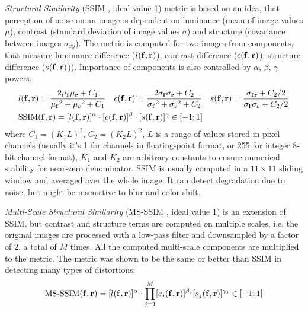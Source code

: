 \textit{Structural Similarity} (SSIM \cite{metric:ssim04}, ideal value 1) metric is based on an idea, that perception of noise on an image is dependent on luminance (mean of image values $\mu$), contrast (standard deviation of image values $\sigma$) and structure (covariance between images $\sigma_{xy}$). The metric is computed for two images from components, that measure luminance difference ($l(\bm{\mathrm{f}}, \bm{\mathrm{r}})$), contrast difference ($c(\bm{\mathrm{f}}, \bm{\mathrm{r}})$), structure difference ($s(\bm{\mathrm{f}}, \bm{\mathrm{r}})$)). Importance of components is also controlled by $\alpha$, $\beta$, $\gamma$ powers.
\begin{equation}
	\setlength\abovedisplayskip{6pt} 
	\begin{aligned}
	& l(\bmr{f}, \bmr{r}) = \frac{2 \mu_{\bmr{f}} \mu_{\bmr{r}} + C_1}{{\mu_{\bmr{f}}}^2 + {\mu_{\bmr{r}}}^2 + C_1} \quad
	c(\bmr{f}, \bmr{r}) = \frac{2 \sigma_{\bmr{f}} \sigma_{\bmr{r}}+ C_2}{{\sigma_{\bmr{f}}}^2 + {\sigma_{\bmr{r}}}^2 + C_2} \quad
	s(\bmr{f}, \bmr{r}) = \frac{\sigma_{\bmr{f}\bmr{r}} + C_2/2}{\sigma_{\bmr{f}}\sigma_{\bmr{r}} + C_2/2} \\
	& \text{SSIM}(\bmr{f}, \bmr{r}) = 
	[l(\bmr{f}, \bmr{r})]^\alpha \cdot
	[c(\bmr{f}, \bmr{r})]^\beta \cdot
	[s(\bmr{f}, \bmr{r})]^\gamma \in [-1;1]
	\end{aligned}
	\setlength\belowdisplayskip{6pt}
\end{equation}
where $C_1 = (K_1L)^2$, $C_2 = (K_2L)^2$,  $L$ is a range of values stored in pixel channels (usually it's 1 for channels in floating-point format, or 255 for integer 8-bit channel format), $K_1$ and $K_2$ are arbitrary constants to ensure numerical stability for near-zero denominator. SSIM is usually computed in a $11 \times 11$ sliding window and averaged over the whole image. It can detect degradation due to noise, but might be insensitive to blur and color shift.

\textit{Multi-Scale Structural Similarity} (MS-SSIM \cite{metric:msssim03}, ideal value 1) is an extension of SSIM, but contrast and structure terms are computed on multiple scales, i.e. the original images are processed with a low-pass filter and downsampled by a factor of 2, a total of $M$ times. All the computed multi-scale components are multiplied to the metric. The metric was shown to be the same or better than SSIM in detecting many types of distortions:
\begin{equation}
	\setlength\abovedisplayskip{0pt} 
	\text{MS-SSIM}(\bmr{f}, \bmr{r}) = 
	[l(\bmr{f}, \bmr{r})]^\alpha \cdot
	\prod_{j=1}^{M}
	[c_j(\bmr{f}, \bmr{r})]^{\beta_{j}}
	[s_j(\bmr{f}, \bmr{r})]^{\gamma_j} \in [-1;1] \setlength\belowdisplayskip{0pt} 
\end{equation}

